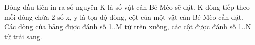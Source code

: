 Dòng đầu tiên in ra số nguyên K là số vật cản Bé Mèo sẽ đặt. K dòng tiếp theo mỗi dòng chứa 2 số x, y là tọa độ dòng, cột của một vật cản Bé Mèo cần đặt. Các dòng của bảng được đánh số 1..M từ trên xuống, các cột được đánh số 1..N từ trái sang.